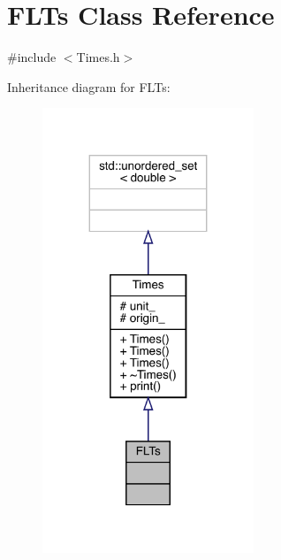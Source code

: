 \hypertarget{class_f_l_ts}{}\section{F\+L\+Ts Class Reference}
\label{class_f_l_ts}


{\ttfamily \#include $<$Times.\+h$>$}



Inheritance diagram for F\+L\+Ts\+:
\nopagebreak
\begin{figure}[H]
\begin{center}
\leavevmode
\includegraphics[width=179pt]{class_f_l_ts__inherit__graph}
\end{center}
\end{figure}


